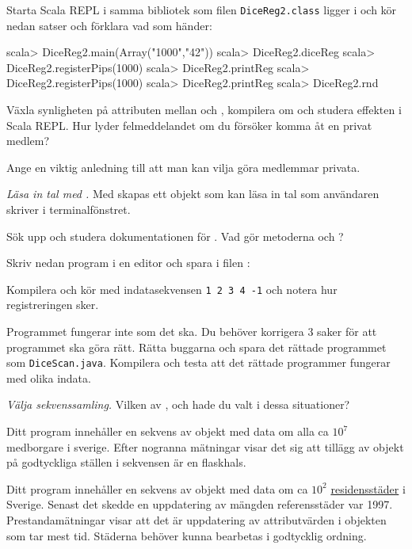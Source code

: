 \Subtask Starta Scala REPL i samma bibliotek som filen \texttt{DiceReg2.class} ligger i och kör nedan satser och förklara vad som händer:
\begin{REPL}
scala> DiceReg2.main(Array("1000","42"))
scala> DiceReg2.diceReg
scala> DiceReg2.registerPips(1000)
scala> DiceReg2.printReg
scala> DiceReg2.registerPips(1000)
scala> DiceReg2.printReg
scala> DiceReg2.rnd
\end{REPL}

\Subtask Växla synligheten på attributen mellan  och , kompilera om och studera effekten i Scala REPL. Hur lyder felmeddelandet om du försöker komma åt en privat medlem?

\Subtask\Pen Ange en viktig anledning till att man kan vilja göra medlemmar privata.



\Task \emph{Läsa in tal med .} Med  skapas ett objekt som kan läsa in tal som användaren skriver i terminalfönstret.

\Subtask Sök upp och studera dokumentationen för . Vad gör metoderna  och ?

\Subtask Skriv nedan program i en editor och spara i filen :


\Subtask Kompilera och kör med indatasekvensen \texttt{1 2 3 4 -1} och notera hur registreringen sker.

\Subtask Programmet fungerar inte som det ska. Du behöver korrigera 3 saker för att programmet ska göra rätt. Rätta buggarna och spara det rättade programmet som \texttt{DiceScan.java}. Kompilera och testa att det rättade programmer fungerar med olika indata.

\Task\Pen \emph{Välja sekvenssamling.} Vilken av ,  och  hade du valt i dessa situationer?		
	
\Subtask Ditt program innehåller en sekvens av objekt med data om alla ca $10^7$ medborgare i sverige. Efter nogranna mätningar visar det sig att tillägg av objekt på godtyckliga ställen i sekvensen är en flaskhals.		
		
\Subtask Ditt program innehåller en sekvens av objekt med data om ca $10^2$ \href{https://sv.wikipedia.org/wiki/Residensstad#Sverige}{residensstäder} i Sverige. Senast det skedde en uppdatering av mängden referensstäder var 1997. Prestandamätningar visar att det är uppdatering av attributvärden i objekten som tar mest tid. Städerna behöver kunna bearbetas i godtycklig ordning.		
		
